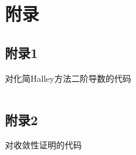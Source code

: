 
\section*{附录}

\subsection*{附录1}\label{sec:app1}

对化简Halley方法二阶导数的代码

\inputminted[linenos]{python}{code/simplify-halley.py}

\subsection*{附录2}\label{sec:app2}

对收敛性证明的代码

\inputminted[linenos]{python}{code/convergence.py}
